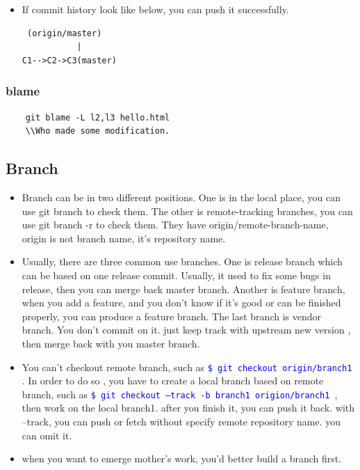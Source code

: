 \documentclass[a4paper,12pt,twoside]{book}
\newcommand{\linuxcommand}[1]{\texttt{\textcolor{blue}{\$ #1 \Pisymbol{psy}{191}}}}
\begin{document}
\begin{itemize}
\begin{itemize}
\item If commit history look like below, you can push it successfully.
\begin{verbatim}
 (origin/master)
           |
C1-->C2->C3(master)
\end{verbatim}
\end{itemize}
\subsubsection{blame} 
    \begin{verbatim}
    git blame -L l2,l3 hello.html
    \\Who made some modification.
    \end{verbatim}


\subsection{Branch}
\begin{itemize}

\item Branch can be in  two different positions. One is in the local place, you can use git branch to check them. The other is remote-tracking branches, you can use git branch -r to check them. They have origin/remote-branch-name, origin is not branch name, it's repository  name. 

\item Usually, there are three common use branches. One is release branch which can be based on one release commit. Usually, it used to fix some bugs in release, then you can merge back master branch. Another is feature branch, when you add a feature, and you don't know if it's good or can be finished properly, you can produce a feature branch. The last branch is vendor branch. You don't commit on it. just keep track with upstream new version , then merge back with you master branch.

\item You can't checkout remote branch, such as \linuxcommand{git checkout origin/branch1}. In order to do so , you have to create a local branch based on remote branch, such as \linuxcommand{git checkout --track -b branch1 origion/branch1}, then work on the local branch1. after you finish it, you can push it back. with --track, you can push or fetch without specify remote repository name. you can omit it.

\item when you want to emerge mother's work, you'd better build a branch first.


\end{itemize}
\end{itemize}
\end{document}
